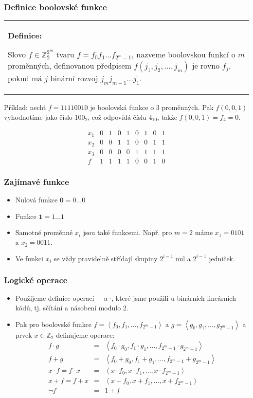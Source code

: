\documentclass{beamer}
\newenvironment{definice}
{
    \begin{center}
    \begin{tabular}{p{9cm}}
    \textbf{Definice:}
}
{
    \end{tabular}
    \end{center}
}
\newcommand{\cela}{\mathbb{Z}}
\newcommand{\zero}{\textbf{0}}
\newcommand{\one}{\textbf{1}}
\newenvironment{itemizex}%
  {\large \begin{itemize}%
    \setlength{\itemsep}{8pt}%
    \setlength{\parskip}{8pt}}%
  {\end{itemize}}
\begin{document}
\begin{frame}[t,fragile]\frametitle{Definice boolovské funkce} 
\begin{definice}
Slovo $f\in\cela_2^{2^m}$ tvaru $f=f_0f_1\dots f_{2^m-1}$, nazveme boolovskou funkcí o $m$ proměnných, definovanou předpisem $f(j_1, j_2, \dots, j_m)$ je rovno $f_j$, pokud má $j$ binární rozvoj $j_mj_{m-1}\dots j_1$.
\end{definice}

Příklad: nechť $f=11110010$ je boolovská funkce o 3 proměnných. Pak $f(0,0,1)$ vyhodnotíme jako  číslo $100_2$, což odpovídá číslu $4_{10}$, takže $f(0,0,1)=f_4=0$.

$$
\begin{array}{l|cccccccc}
x_1&0&1&0&1&0&1&0&1\\
x_2&0&0&1&1&0&0&1&1\\
x_3&0&0&0&0&1&1&1&1\\\hline
f&1&1&1&1&0&0&1&0
\end{array}
$$
\end{frame}


\begin{frame}[t,fragile]\frametitle{Zajímavé funkce} 
    \begin{itemizex}
        \item Nulová funkce $\zero=0\dots0$
        \item Funkce $\one=1\dots1$
        \item Samotné proměnné $x_i$ jsou také funkcemi. Např. pro $m=2$ máme $x_1=0101$ a $x_2=0011$.
        \item Ve funkci $x_i$ se vždy pravidelně střídají skupiny $2^{i-1}$ nul a $2^{i-1}$ jedniček.
    \end{itemizex}
\end{frame}


\begin{frame}[t,fragile]\frametitle{Logické operace} 
    \begin{itemizex}
        \item Použijeme definice operací $+$ a $\cdot$, které jsme použili u binárních lineárních kódů, tj. sčítání a násobení modulo 2.
        \item Pak pro boolovské funkce $f=\left<f_0,f_1,\dots,f_{2^m-1}\right>$ a $g=\left<g_0,g_1,\dots, g_{2^m-1}\right>$ a prvek $x\in\cela_2$ definujeme operace:
        \begin{eqnarray*}
f\cdot g&=& \left<f_0\cdot g_0, f_1\cdot g_1,\dots, f_{2^m-1}\cdot g_{2^m-1}\right>\\
f+ g&=& \left<f_0+ g_0, f_1+ g_1,\dots, f_{2^m-1}+ g_{2^m-1}\right>\\
x\cdot f=f\cdot x&=& \left<x\cdot f_0, x\cdot f_1,\dots, x\cdot f_{2^m-1}\right>\\
x+f=f+x&=& \left<x+f_0, x+f_1,\dots, x+f_{2^m-1}\right>\\
\neg f&=& 1+f
        \end{eqnarray*}
    \end{itemizex}
\end{frame}
\end{document}
